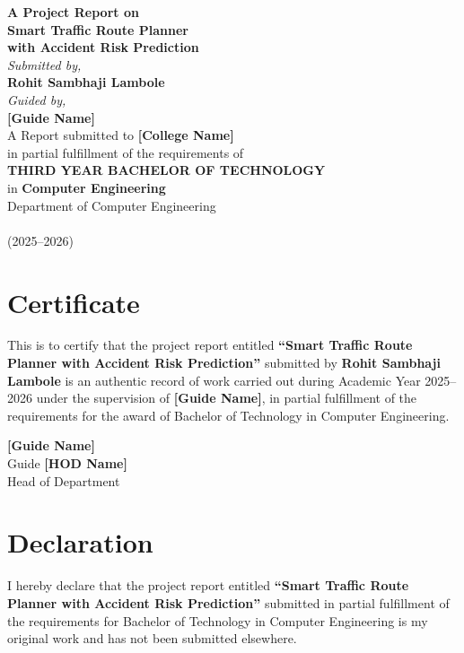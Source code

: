 \documentclass[12pt,a4paper]{report}
\begin{document}
\begin{titlepage}
\begin{center}
\vspace*{1cm}
{\Huge \textbf{A Project Report on}}\\[0.7cm]
{\Huge \textbf{Smart Traffic Route Planner}}\\[0.3cm]
{\Huge \textbf{with Accident Risk Prediction}}\\[1.5cm]
\textit{Submitted by,}\\[0.5cm]
\textbf{Rohit Sambhaji Lambole}\\[1.5cm]
\textit{Guided by,}\\[0.5cm]
\textbf{[Guide Name]}\\[1.5cm]
A Report submitted to \textbf{[College Name]}\\
in partial fulfillment of the requirements of\\
\textbf{THIRD YEAR BACHELOR OF TECHNOLOGY}\\
in \textbf{Computer Engineering}\\
\vfill
Department of Computer Engineering\\
[College Name] \\ (2025--2026)
\end{center}
\end{titlepage}

\chapter*{Certificate}
This is to certify that the project report entitled \textbf{``Smart Traffic Route Planner with Accident Risk Prediction''} submitted by \textbf{Rohit Sambhaji Lambole} is an authentic record of work carried out during Academic Year 2025--2026 under the supervision of \textbf{[Guide Name]}, in partial fulfillment of the requirements for the award of Bachelor of Technology in Computer Engineering.

\vspace{3cm}
\begin{flushleft}
\textbf{[Guide Name]}\\Guide \hfill \textbf{[HOD Name]}\\Head of Department
\end{flushleft}
\newpage

\chapter*{Declaration}
I hereby declare that the project report entitled \textbf{``Smart Traffic Route Planner with Accident Risk Prediction''} submitted in partial fulfillment of the requirements for Bachelor of Technology in Computer Engineering is my original work and has not been submitted elsewhere.
\end{document}
